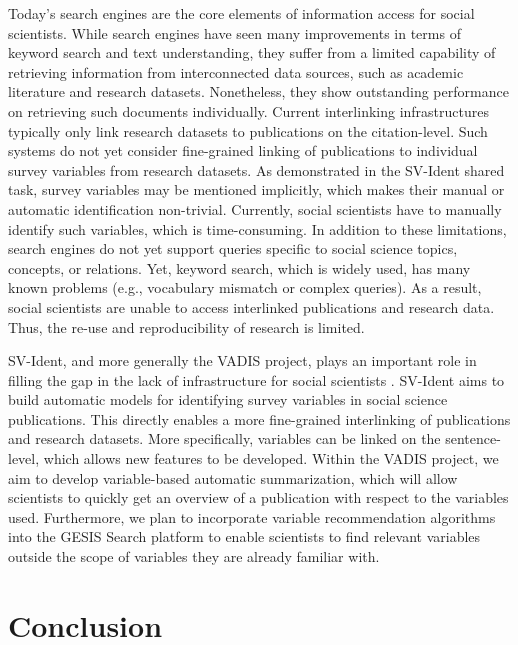\documentclass[11pt]{article}
\begin{document}
Today’s search engines are the core elements of information access for social scientists.
While search engines have seen many improvements in terms of keyword search and text understanding, they suffer from a limited capability of retrieving information from interconnected data sources, such as academic literature and research datasets.
Nonetheless, they show outstanding performance on retrieving such documents individually.
Current interlinking infrastructures typically only link research datasets to publications on the citation-level.
Such systems do not yet consider fine-grained linking of publications to individual survey variables from research datasets.
As demonstrated in the SV-Ident shared task, survey variables may be mentioned implicitly, which makes their manual or automatic identification non-trivial.
Currently, social scientists have to manually identify such variables, which is time-consuming.
In addition to these limitations, search engines do not yet support queries specific to social science topics, concepts, or relations.
Yet, keyword search, which is widely used, has many known problems (e.g., vocabulary mismatch or complex queries).
As a result, social scientists are unable to access interlinked publications and research data.
Thus, the re-use and reproducibility of research is limited.

SV-Ident, and more generally the VADIS project, plays an important role in filling the gap in the lack of infrastructure for social scientists \cite{kartal2022}.
SV-Ident aims to build automatic models for identifying survey variables in social science publications.
This directly enables a more fine-grained interlinking of publications and research datasets.
More specifically, variables can be linked on the sentence-level, which allows new features to be developed.
Within the VADIS project, we aim to develop variable-based automatic summarization, which will allow scientists to quickly get an overview of a publication with respect to the variables used.
Furthermore, we plan to incorporate variable recommendation algorithms into the GESIS Search platform to enable scientists to find relevant variables outside the scope of variables they are already familiar with.


\section{Conclusion}
\label{sec:conclusion}
\end{document}
